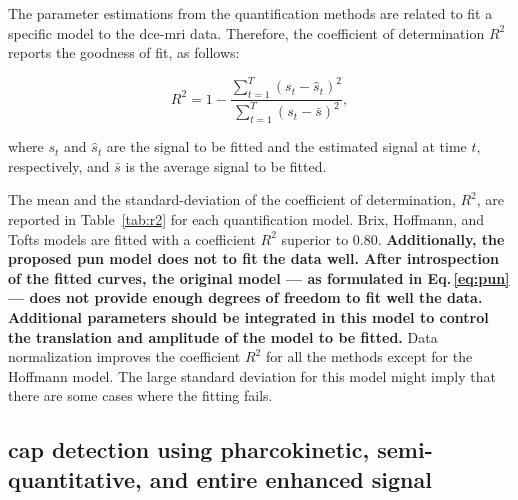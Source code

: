 The parameter estimations from the quantification methods are related to fit a specific model to the \ac{dce}-\ac{mri} data.
Therefore, the coefficient of determination $R^2$ reports the goodness
of fit, as follows:

\begin{equation}
  R^2 = 1 - \frac{\sum_{t = 1}^{T} (s_t - \hat{s}_t)^2}{\sum_{t = 1}^{T} (s_t - \bar{s})^2} ,
  \label{eq:r2}
\end{equation}

\noindent where $s_t$ and $\hat{s}_t$ are the signal to be fitted and
the estimated signal at time $t$, respectively, and $\bar{s}$ is the average signal to be fitted.

The mean and the standard-deviation of the coefficient of determination, $R^{2}$, are reported in Table~\ref{tab:r2} for each quantification model.
Brix, Hoffmann, and Tofts models are fitted with a coefficient $R^{2}$ superior to 0.80.
\textbf{Additionally, the proposed \ac{pun} model does not to fit the data well.
After introspection of the fitted curves, the original model --- as
formulated in Eq.\,\eqref{eq:pun} --- does not provide enough degrees
of freedom to fit well the data. Additional parameters should be
integrated in this model to control the translation and amplitude of
the model to be fitted.}
Data normalization improves the coefficient $R^2$ for all the methods
except for the Hoffmann model.
The large standard deviation for this model might imply that there are some cases where the fitting fails.


\subsection{\acs*{cap} detection using pharcokinetic,
  semi-quantitative, and entire enhanced signal}

